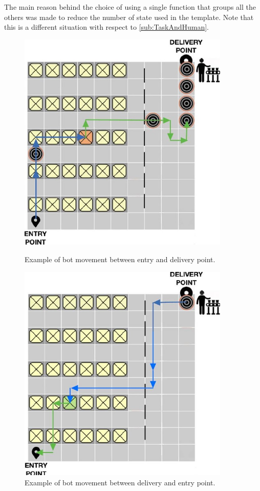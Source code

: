 \documentclass{article}
\begin{document}
				The main reason behind the choice of using a single function that groups all the others was made to reduce the number of state used in the template. Note that this is a different situation with respect to \ref{sub:TaskAndHuman}.
				
				\begin{figure}[H]
					\centering
					\begin{minipage}{0.45\textwidth}
						\centering
						\includegraphics[width=0.9\textwidth]{./Images/BotMovement1.JPG}
						\caption{Example of bot movement between entry and delivery point.}
					\end{minipage}\hfill
					\begin{minipage}{0.45\textwidth}
						\centering
						\includegraphics[width=0.9\textwidth]{./Images/BotMovement2.JPG}
						\caption{Example of bot movement between delivery and entry point.}
					\end{minipage}
				\end{figure}
				
\end{document}
